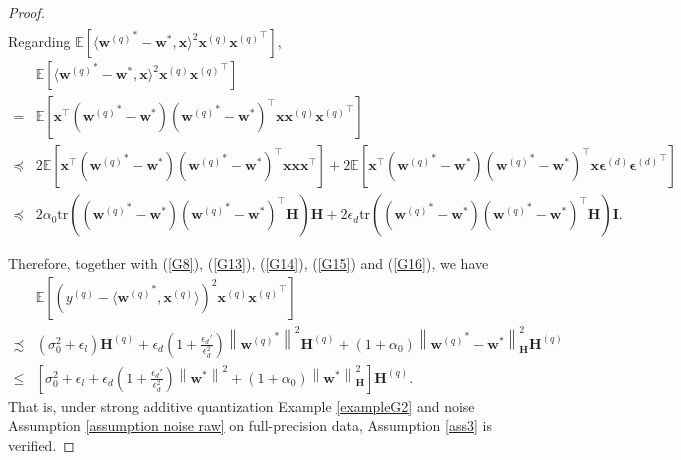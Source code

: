 \documentclass[11pt, letterpaper]{article}
\begin{document}
\begin{proof}
\begin{equation}
\begin{aligned}
        \end{aligned}
    \end{equation}
    Regarding $\mathbb{E}\left[\langle {\mathbf{w}^{(q)}}^*- \mathbf{w}^*,\mathbf{x}\rangle^2{\mathbf{x}^{(q)}}{\mathbf{x}^{(q)}}^\top\right]$,
    \begin{equation}
    \label{G16}
        \begin{aligned}
            &\mathbb{E}\left[\langle {\mathbf{w}^{(q)}}^*- \mathbf{w}^*,\mathbf{x}\rangle^2{\mathbf{x}^{(q)}}{\mathbf{x}^{(q)}}^\top\right]\\
            =&\mathbb{E}\left[\mathbf{x}^\top ({\mathbf{w}^{(q)}}^*- \mathbf{w}^*)({\mathbf{w}^{(q)}}^*- \mathbf{w}^*)^\top\mathbf{x}{\mathbf{x}^{(q)}}{\mathbf{x}^{(q)}}^\top\right]\\
            \preceq & 2\mathbb{E}\left[\mathbf{x}^\top ({\mathbf{w}^{(q)}}^*- \mathbf{w}^*)({\mathbf{w}^{(q)}}^*- \mathbf{w}^*)^\top\mathbf{x}{\mathbf{x}}{\mathbf{x}}^\top\right]+2\mathbb{E}\left[\mathbf{x}^\top ({\mathbf{w}^{(q)}}^*- \mathbf{w}^*)({\mathbf{w}^{(q)}}^*- \mathbf{w}^*)^\top\mathbf{x}{\boldsymbol{\epsilon}^{(d)}}{\boldsymbol{\epsilon}^{(d)}}^\top\right]\\
            \preceq& 2\alpha_0\mathrm{tr}\left(({\mathbf{w}^{(q)}}^*- \mathbf{w}^*)({\mathbf{w}^{(q)}}^*- \mathbf{w}^*)^\top\mathbf{H}\right)\mathbf{H}+2\epsilon_d\mathrm{tr}\left(({\mathbf{w}^{(q)}}^*- \mathbf{w}^*)({\mathbf{w}^{(q)}}^*- \mathbf{w}^*)^\top\mathbf{H}\right)\mathbf{I}.
        \end{aligned}
    \end{equation}

    Therefore, together with (\ref{G8}), (\ref{G13}), (\ref{G14}), (\ref{G15}) and (\ref{G16}), we have
    \begin{equation*}
        \begin{aligned}
            &\mathbb{E}\left[(y^{(q)}-\langle {\mathbf{w}^{(q)}}^*,\mathbf{x}^{(q)}\rangle)^2{\mathbf{x}^{(q)}}{\mathbf{x}^{(q)}}^\top\right]\\
            \precsim &(\sigma_0^2+\epsilon_l)\mathbf{H}^{(q)}+\epsilon_d(1+\frac{\epsilon_d'}{\epsilon_d^2})\left\|{\mathbf{w}^{(q)}}^*\right\|^2\mathbf{H}^{(q)}+(1+\alpha_0)\left\|{\mathbf{w}^{(q)}}^*-\mathbf{w}^*\right\|_\mathbf{H}^2\mathbf{H}^{(q)}\\
            \leq& \left[\sigma_0^2+\epsilon_l+\epsilon_d(1+\frac{\epsilon_d'}{\epsilon_d^2})\left\|{\mathbf{w}}^*\right\|^2+(1+\alpha_0)\left\|{\mathbf{w}}^*\right\|_\mathbf{H}^2\right]\mathbf{H}^{(q)}.
        \end{aligned}
    \end{equation*}
    That is, under strong additive quantization Example \ref{exampleG2} and noise Assumption \ref{assumption noise raw} on full-precision data, Assumption \ref{ass3} is verified.
\end{proof}
\end{document}
